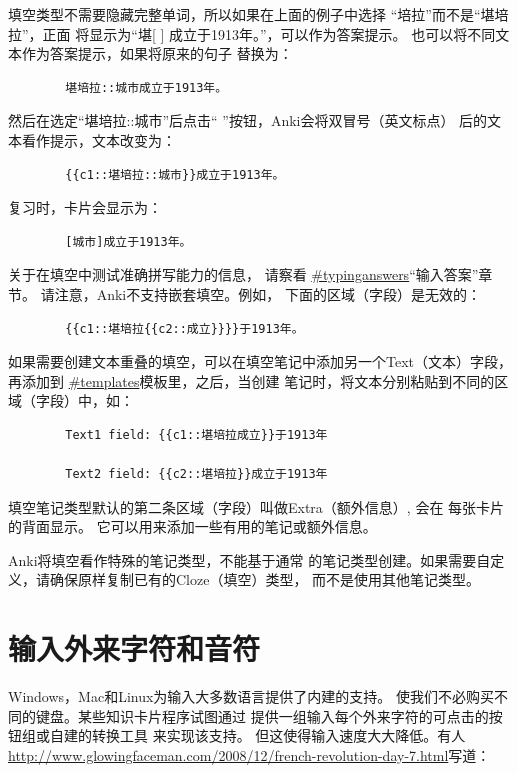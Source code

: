 \documentclass[a4paper]{book}
\begin{document}
	填空类型不需要隐藏完整单词，所以如果在上面的例子中选择 “培拉”而不是“堪培拉”，正面 将显示为“堪[
	] 成立于1913年。”，可以作为答案提示。
	也可以将不同文本作为答案提示，如果将原来的句子 替换为：
	
	\begin{shaded}\begin{verbatim}
		堪培拉::城市成立于1913年。
		\end{verbatim}\end{shaded}
	然后在选定“堪培拉::城市”后点击“
	”按钮，Anki会将双冒号（英文标点） 后的文本看作提示，文本改变为：
	\begin{shaded}\begin{verbatim}
		{{c1::堪培拉::城市}}成立于1913年。
		\end{verbatim}\end{shaded}
	复习时，卡片会显示为：
	\begin{shaded}\begin{verbatim}
		[城市]成立于1913年。
		\end{verbatim}\end{shaded}
	关于在填空中测试准确拼写能力的信息， 请察看
	\url{#typinganswers}“输入答案”章节。
	请注意，Anki不支持嵌套填空。例如， 下面的区域（字段）是无效的：
	
	\begin{shaded}\begin{verbatim}
		{{c1::堪培拉{{c2::成立}}}}于1913年。
		\end{verbatim}\end{shaded}
	如果需要创建文本重叠的填空，可以在填空笔记中添加另一个Text（文本）字段，再添加到 \url{#templates}模板里，之后，当创建 笔记时，将文本分别粘贴到不同的区域（字段）中，如：
	
	\begin{shaded}\begin{verbatim}
		Text1 field: {{c1::堪培拉成立}}于1913年
		
		Text2 field: {{c2::堪培拉}}成立于1913年
		\end{verbatim}\end{shaded}
	填空笔记类型默认的第二条区域（字段）叫做Extra（额外信息）, 会在 每张卡片的背面显示。 它可以用来添加一些有用的笔记或额外信息。
	
	Anki将填空看作特殊的笔记类型，不能基于通常 的笔记类型创建。如果需要自定义，请确保原样复制已有的Cloze（填空）类型， 而不是使用其他笔记类型。
	
	\section{输入外来字符和音符}
	Windows，Mac和Linux为输入大多数语言提供了内建的支持。 使我们不必购买不同的键盘。某些知识卡片程序试图通过 提供一组输入每个外来字符的可点击的按钮组或自建的转换工具 来实现该支持。 但这使得输入速度大大降低。有人
	\url{http://www.glowingfaceman.com/2008/12/french-revolution-day-7.html}写道：
	
\end{document}

